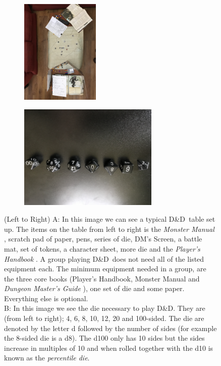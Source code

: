 \documentclass[progress]{cmpreport}
\newcommand{\dnd}{D\&D}
\begin{document}
	\begin{figure}[h] 
		\begin{subfigure}{0.5\textwidth}
			\includegraphics[width=1\linewidth, height=5cm, angle=180]{DnD_Live.jpg}
			\label{DnDLive}
		\end{subfigure}
		\begin{subfigure}{0.5\textwidth}
			\includegraphics[width=1\linewidth, height=5cm, angle=180]{DnD_Dice.jpg}
			\label{DnDDice}
		\end{subfigure}
		\caption{(Left to Right) A: In this image we can see a typical \dnd \ table set up. The items on the table from left to right is the \emph{Monster Manual} \citep{MonsterManual}, scratch pad of paper, pens, series of die, DM's Screen, a battle mat, set of tokens, a character sheet, more die and the \emph{Player's Handbook} \citep{PlayerHandbook}. A group playing \dnd \ does not need all of the listed equipment each. The minimum equipment needed in a group, are the three core books (Player's Handbook, Monster Manual and \emph{Dungeon Master's Guide} \citep{DMGuide}), one set of die and some paper. Everything else is optional. \\ B: In this image we see the die necessary to play \dnd. They are (from left to right); 4, 6, 8, 10, 12, 20 and 100-sided. The die are denoted by the letter d followed by the number of sides (for example the 8-sided die is a d8). The d100 only has 10 sides but the sides increase in multiples of 10 and when rolled together with the d10 is known as the \emph{percentile die}.}
		\label{fig:DnDEquipmentExample}
	\end{figure}
\end{document}
